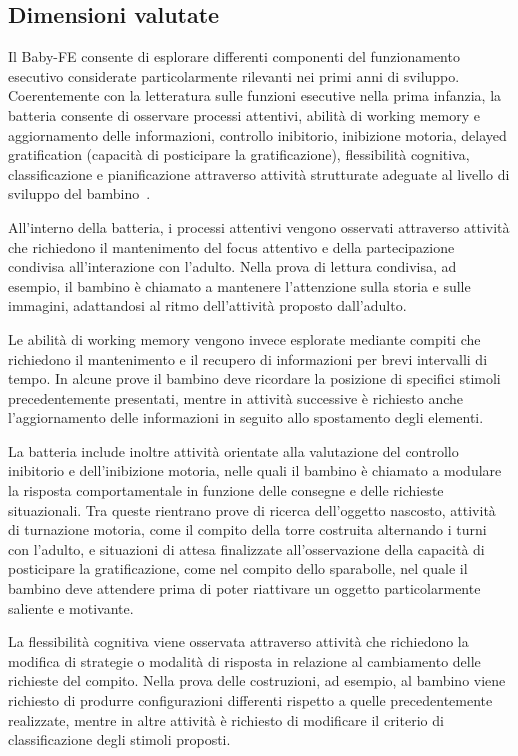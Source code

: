         \subsection{Dimensioni valutate}
        \label{sec:3_7_4}

            Il Baby-FE consente di esplorare differenti componenti del funzionamento esecutivo considerate particolarmente rilevanti nei primi anni di sviluppo. Coerentemente con la letteratura sulle funzioni esecutive nella prima infanzia, la batteria consente di osservare processi attentivi, abilità di working memory e aggiornamento delle informazioni, controllo inibitorio, inibizione motoria, delayed gratification (capacità di posticipare la gratificazione), flessibilità cognitiva, classificazione e pianificazione attraverso attività strutturate adeguate al livello di sviluppo del bambino~\cite{diamond2013,garon2008}.

            All'interno della batteria, i processi attentivi vengono osservati attraverso attività che richiedono il mantenimento del focus attentivo e della partecipazione condivisa all'interazione con l'adulto. Nella prova di lettura condivisa, ad esempio, il bambino è chiamato a mantenere l'attenzione sulla storia e sulle immagini, adattandosi al ritmo dell'attività proposto dall'adulto.

            Le abilità di working memory vengono invece esplorate mediante compiti che richiedono il mantenimento e il recupero di informazioni per brevi intervalli di tempo. In alcune prove il bambino deve ricordare la posizione di specifici stimoli precedentemente presentati, mentre in attività successive è richiesto anche l'aggiornamento delle informazioni in seguito allo spostamento degli elementi.

            La batteria include inoltre attività orientate alla valutazione del controllo inibitorio e dell'inibizione motoria, nelle quali il bambino è chiamato a modulare la risposta comportamentale in funzione delle consegne e delle richieste situazionali. Tra queste rientrano prove di ricerca dell'oggetto nascosto, attività di turnazione motoria, come il compito della torre costruita alternando i turni con l'adulto, e situazioni di attesa finalizzate all'osservazione della capacità di posticipare la gratificazione, come nel compito dello sparabolle, nel quale il bambino deve attendere prima di poter riattivare un oggetto particolarmente saliente e motivante.

            La flessibilità cognitiva viene osservata attraverso attività che richiedono la modifica di strategie o modalità di risposta in relazione al cambiamento delle richieste del compito. Nella prova delle costruzioni, ad esempio, al bambino viene richiesto di produrre configurazioni differenti rispetto a quelle precedentemente realizzate, mentre in altre attività è richiesto di modificare il criterio di classificazione degli stimoli proposti.


